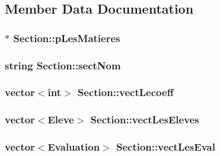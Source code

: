 \subsection{Member Data Documentation}
\hypertarget{class_section_ac17caecb3173b03d091f0da63859ccf2}{
\subsubsection[{p\+Les\+Matieres}]{$\ast$ Section\+::p\+Les\+Matieres\hspace{0.3cm}{\ttfamily [private]}}}\label{class_section_ac17caecb3173b03d091f0da63859ccf2}
\hypertarget{class_section_a6bc65da19bac80f150c12fe7b1ec60f0}{
\subsubsection[{sect\+Nom}]{\setlength{\rightskip}{0pt plus 5cm}string Section\+::sect\+Nom\hspace{0.3cm}{\ttfamily [private]}}}\label{class_section_a6bc65da19bac80f150c12fe7b1ec60f0}
\hypertarget{class_section_a4391f73c5482646871f523c61c9eed4e}{
\subsubsection[{vect\+Lecoeff}]{\setlength{\rightskip}{0pt plus 5cm}vector$<$int$>$ Section\+::vect\+Lecoeff\hspace{0.3cm}{\ttfamily [private]}}}\label{class_section_a4391f73c5482646871f523c61c9eed4e}
\hypertarget{class_section_a6b3a5b7f8977fd81df7d77a2c125fb72}{
\subsubsection[{vect\+Les\+Eleves}]{\setlength{\rightskip}{0pt plus 5cm}vector$<${\bf Eleve}$>$ Section\+::vect\+Les\+Eleves\hspace{0.3cm}{\ttfamily [private]}}}\label{class_section_a6b3a5b7f8977fd81df7d77a2c125fb72}
\hypertarget{class_section_ad2db5d73bfcd6d8586168b72f3a9655a}{
\subsubsection[{vect\+Les\+Eval}]{\setlength{\rightskip}{0pt plus 5cm}vector$<${\bf Evaluation}$>$ Section\+::vect\+Les\+Eval\hspace{0.3cm}{\ttfamily [private]}}}\label{class_section_ad2db5d73bfcd6d8586168b72f3a9655a}
